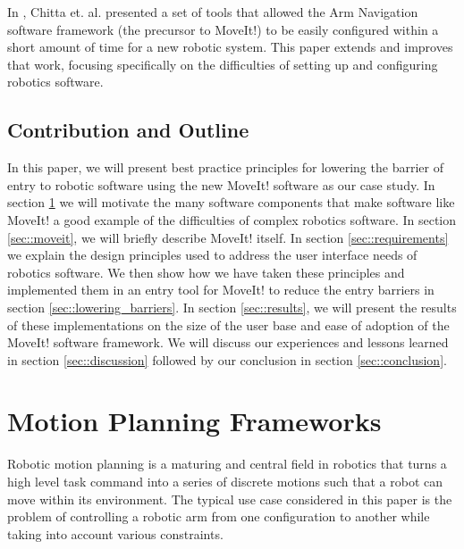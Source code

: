 \documentclass[10pt,journal,compsoc]{joser1}
\begin{document}
{In \cite{chitta2012perception}, Chitta et. al. presented a set of tools that allowed the Arm Navigation software framework (the precursor to MoveIt!) to be easily configured within a short amount of time for a new robotic system. This paper extends and improves that work, focusing specifically on the difficulties of setting up and configuring robotics software.

\subsection{Contribution and Outline}

In this paper, we will present best practice principles for lowering the barrier of entry to robotic software using the new MoveIt! software \cite{moveit} as our case study. In section \ref{sec::motion_planning} we will motivate the many software components that make software like MoveIt! a good example of the difficulties of complex robotics software. In section \ref{sec::moveit}, we will briefly describe MoveIt! itself. In section \ref{sec::requirements} we explain the design principles used to address the user interface needs of robotics software. We then show how we have taken these principles and implemented them in an entry tool for MoveIt! to reduce the entry barriers in section \ref{sec::lowering_barriers}. In section \ref{sec::results}, we will present the results of these implementations on the size of the user base and ease of adoption of the MoveIt! software framework. We will discuss our experiences and lessons learned in section \ref{sec::discussion} followed by our conclusion in section \ref{sec::conclusion}.

\section{Motion Planning Frameworks}
\label{sec::motion_planning}

Robotic motion planning is a maturing and central field in robotics \cite{moll2011teaching} that turns a high level task command into a series of discrete motions such that a robot can move within its environment. The typical use case considered in this paper is the problem of controlling a robotic arm from one configuration to another while taking into account various constraints.

}
\end{document}
